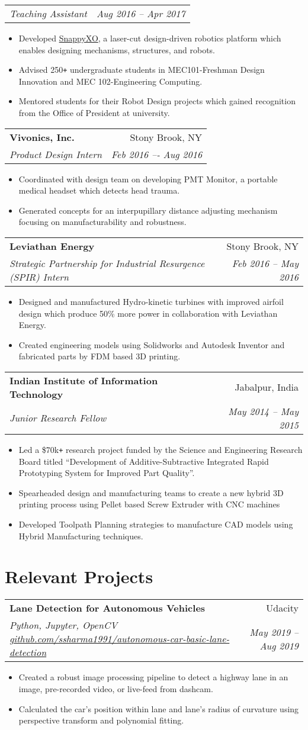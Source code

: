 \documentclass[letterpaper,10pt]{article}
\makeatletter
\newcommand{\resumeHeading}[4]{
  \vspace{-1pt}
    \begin{tabular*}{0.97\textwidth}{l@{\extracolsep{\fill}}r}
      \textbf{#1} & #2 \vspace{-2pt}\\ \vspace{1pt}
      \textit{\small#3} & \textit{\small #4} \\
    \end{tabular*}
}
\newcommand{\resumeSubheadingWithDate}[2]{
    \begin{tabular*}{0.97\textwidth}{l@{\extracolsep{\fill}}r}
      \textit{\small#1} & \textit{\small #2}\\
    \end{tabular*}
    \vspace{+2pt}
}
\newcommand{\resumeSection}[1]{
\vspace{-12pt}
\section{\textbf{#1}}
}
\newcommand{\resumeItemListStart}{
\vspace{-7pt}
\begin{itemize}[leftmargin=14pt]
}
\newcommand{\resumeItemListEnd}{
\vspace{+7pt}
\end{itemize}
}
\newcommand{\resumeItem}[1]{
  \item\small{
      {#1 \vspace{-7pt}
      }
  }
}
\makeatother
\begin{document}
    \vspace{-5pt}
    \resumeSubheadingWithDate{Teaching Assistant}{Aug 2016 -- Apr 2017}
    \resumeItemListStart
    \resumeItem{Developed \href{http://snappyxo.com/}{SnappyXO}, a laser-cut design-driven robotics platform which enables designing mechanisms, structures, and robots.}
    \resumeItem{Advised 250\texttt{+} undergraduate students in MEC101-Freshman Design Innovation and MEC 102-Engineering Computing.}
    \resumeItem{Mentored students for their Robot Design projects which gained recognition from the Office of President at university.}
    \resumeItemListEnd
    
    \resumeHeading
    {Vivonics, Inc.}{Stony Brook, NY}
    {Product Design Intern}{Feb 2016 –- Aug 2016}
    \resumeItemListStart
    \resumeItem{Coordinated with design team on developing PMT Monitor, a portable medical headset which detects head trauma.}
    \resumeItem{Generated concepts for an interpupillary distance adjusting mechanism focusing on manufacturability and robustness.}
    \resumeItemListEnd
    
    \resumeHeading
    {Leviathan Energy}{Stony Brook, NY}
    {Strategic Partnership for Industrial Resurgence (SPIR) Intern}{Feb 2016 – May 2016}
    \resumeItemListStart
    \resumeItem{Designed and manufactured Hydro-kinetic turbines with improved airfoil design which produce 50\% more power in collaboration with Leviathan Energy.}
    \resumeItem{Created engineering models using Solidworks and Autodesk Inventor and fabricated parts by FDM based 3D printing.}
    \resumeItemListEnd
    
    \resumeHeading
    {Indian Institute of Information Technology}{Jabalpur, India}
    {Junior Research Fellow}{May 2014 -- May 2015}
    \resumeItemListStart
    \resumeItem{Led a \$70k\texttt{+} research project funded by the Science and Engineering Research Board titled “Development of Additive-Subtractive Integrated Rapid Prototyping System for Improved Part Quality”.}
    \resumeItem{Spearheaded design and manufacturing teams to create a new hybrid 3D printing process using Pellet based Screw Extruder with CNC machines}
    \resumeItem{Developed Toolpath Planning strategies to manufacture CAD models using Hybrid Manufacturing techniques.}
    \resumeItemListEnd



\resumeSection{Relevant Projects}
	
	\resumeHeading{Lane Detection for Autonomous Vehicles}{Udacity}{Python, Jupyter, OpenCV \href{https://github.com/ssharma1991/autonomous-car-basic-lane-detection}{github.com/ssharma1991/autonomous-car-basic-lane-detection}}{May 2019 -- Aug 2019}
	\resumeItemListStart
	\resumeItem{Created a robust image processing pipeline to detect a highway lane in an image, pre-recorded video, or live-feed from dashcam.}
	\resumeItem{Calculated the car's position within lane and lane's radius of curvature using perspective transform and polynomial fitting.}
	\resumeItemListEnd
	
\end{document}
